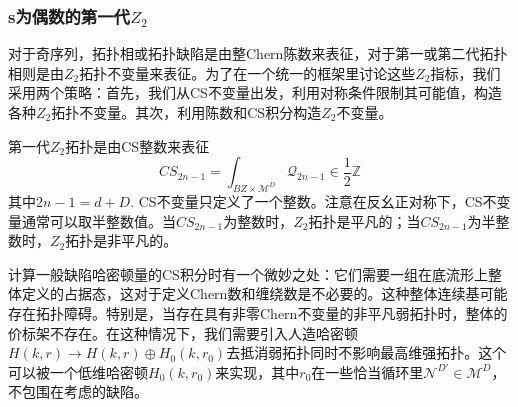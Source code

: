 \documentclass{article}
\numberwithin{equation}{subsection}
\begin{document}
\subsubsection{s为偶数的第一代$Z_2$}
对于奇序列，拓扑相或拓扑缺陷是由整Chern陈数来表征，对于第一或第二代拓扑相则是由$Z_2$拓扑不变量来表征。为了在一个统一的框架里讨论这些$Z_2$指标，我们采用两个策略：首先，我们从CS不变量出发，利用对称条件限制其可能值，构造各种$Z_2$拓扑不变量。其次，利用陈数和CS积分构造$Z_2$不变量。

第一代$Z_2$拓扑是由CS整数来表征
\begin{equation}\label{Z2CS}
    CS_{2n-1}=\int_{BZ\times\mathcal{M}^D}\mathcal{Q}_{2n-1}\in\frac{1}{2}\mathbb{Z}
\end{equation}
其中$2n-1=d+D$. CS不变量只定义了一个整数。注意在反幺正对称下，CS不变量通常可以取半整数值。当$CS_{2n−1}$为整数时，$Z_2$拓扑是平凡的；当$CS_{2n−1}$为半整数时，$Z_2$拓扑是非平凡的。

计算一般缺陷哈密顿量的CS积分时有一个微妙之处：它们需要一组在底流形上整体定义的占据态，这对于定义Chern数和缠绕数是不必要的。这种整体连续基可能存在拓扑障碍。特别是，当存在具有非零Chern不变量的非平凡弱拓扑时，整体的价标架不存在。在这种情况下，我们需要引入人造哈密顿$H(k,r)\rightarrow H(k,r)\oplus H_0(k,r_0)$去抵消弱拓扑同时不影响最高维强拓扑。这个可以被一个低维哈密顿$H_0(k,r_0)$来实现，其中$r_0$在一些恰当循环里$\mathcal{N}^{D'}\in\mathcal{M}^D$，不包围在考虑的缺陷。
\end{document}
